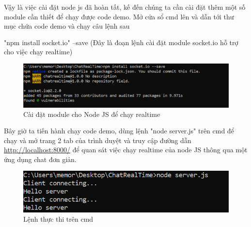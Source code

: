 \documentclass{report}
\begin{document}
\smallskip

Vậy là việc cài đặt node js đã hoàn tất, kế đến chúng ta cần cài đặt thêm một số module cần thiết để chạy được code demo. Mở cửa sổ cmd lên và dẫn tới thư mục chứa code demo và chạy câu lệnh sau

"npm install socket.io" --save (Đây là đoạn lệnh cài đặt module socket.io hỗ trợ cho việc chạy realtime)

\begin{center}
    \begin{figure}[htp]
    \begin{center}
     \includegraphics[scale=0.8]{module.png}
    \end{center}
    \caption{Cài đặt module cho Node JS để chạy realtime}
    \label{refhinh1}
    \end{figure}
\end{center}


Bây giờ ta tiến hành chạy code demo, dùng lệnh "node server.js" trên cmd để chạy và mở trang 2 tab của trình duyệt và truy cập đường dẫn \url{http://localhost:8000/} để quan sát việc chạy realtime của node JS thông qua một ứng dụng chat đơn giản.

\begin{center}
    \begin{figure}[htp]
    \begin{center}
     \includegraphics[scale=1.2]{run.png}
    \end{center}
    \caption{Lệnh thực thi trên cmd}
    \label{refhinh1}
    \end{figure}
\end{center}
\end{document}
